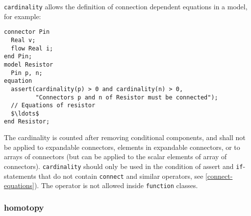 \begin{nonnormative}
\lstinline!cardinality! allows the definition of connection dependent equations in a model, for example:
\begin{lstlisting}[language=modelica]
connector Pin
  Real v;
  flow Real i;
end Pin;
model Resistor
  Pin p, n;
equation
  assert(cardinality(p) > 0 and cardinality(n) > 0,
         "Connectors p and n of Resistor must be connected");
  // Equations of resistor
  $\ldots$
end Resistor;
\end{lstlisting}
\end{nonnormative}

The cardinality is counted after removing conditional components, and shall not be applied to expandable connectors, elements in expandable connectors, or to arrays of connectors (but can be applied to the scalar elements of array of connectors).
\lstinline!cardinality! should only be used in the condition of assert and \lstinline!if!-statements that do not contain \lstinline!connect! and similar operators, see \cref{connect-equations}).
The operator is not allowed inside \lstinline!function! classes.

\subsubsection{homotopy}\label{homotopy}

